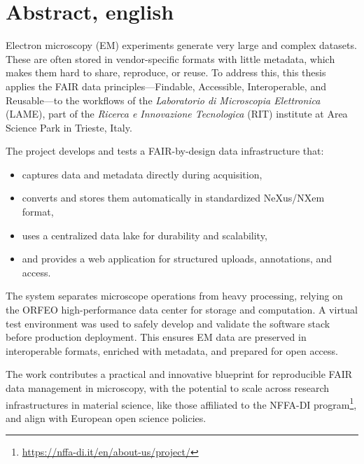 \chapter{Abstract, english}

Electron microscopy (EM) experiments generate very large and complex datasets. 
These are often stored in vendor-specific formats with little metadata, which makes them hard to share, reproduce, or reuse. 
To address this, this thesis applies the FAIR data principles---Findable, Accessible, Interoperable, and Reusable---to the workflows of the \textit{Laboratorio di Microscopia Elettronica} (LAME), part of the \textit{Ricerca e Innovazione Tecnologica} (RIT) institute at Area Science Park in Trieste, Italy.

The project develops and tests a FAIR-by-design data infrastructure that:
\begin{itemize}
	\item captures data and metadata directly during acquisition,
	\item converts and stores them automatically in standardized NeXus/NXem format,
	\item uses a centralized data lake for durability and scalability,
	\item and provides a web application for structured uploads, annotations, and access.
\end{itemize}

The system separates microscope operations from heavy processing, relying on the ORFEO high-performance data center for storage and computation. A virtual test environment was used to safely develop and validate the software stack before production deployment. This ensures EM data are preserved in interoperable formats, enriched with metadata, and prepared for open access.

The work contributes a practical and innovative blueprint for reproducible FAIR data management in microscopy, with the potential to scale across research infrastructures in material science, like those affiliated to the NFFA-DI program\footnote{\url{https://nffa-di.it/en/about-us/project/}}, and align with European open science policies.
